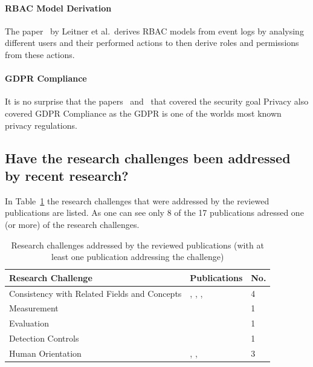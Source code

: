 \documentclass[runningheads]{llncs}
\begin{document}
\paragraph{RBAC Model Derivation} The paper~\cite{Leitner2013719} by Leitner et al.\ derives RBAC models from event logs by analysing different users and their performed actions to then derive roles and permissions from these actions.
\paragraph{GDPR Compliance} It is no surprise that the papers~\cite{Zaman20192982} and~\cite{MozafariMehr202182} that covered the security goal Privacy also covered GDPR Compliance as the GDPR is one of the worlds most known privacy regulations.
\subsection{Have the research challenges been addressed by recent research?}\label{Q2}
In Table~\ref{challenges_table} the research challenges that were addressed by the reviewed publications are listed. As one can see only 8 of the 17 publications adressed one (or more) of the research challenges.\\
\begin{table}
    \centering
    \caption{Research challenges addressed by the reviewed publications (with at least one publication addressing the challenge)}
    \label{challenges_table}
    \begin{tabular}{ | l | l | l | }
        \hline
        \textbf{Research Challenge}                  & \textbf{Publications}                                                                         & \textbf{No. } \\
        \hline
        \hline
        Consistency with Related Fields and Concepts & \cite{Zaman20192982}, \cite{Accorsi20131462}, \cite{Zahoransky2014360}, \cite{Dedousis202235} & 4             \\
        \hline
        Measurement                                  & \cite{Dedousis202235}                                                                         & 1             \\
        \hline
        Evaluation                                   & \cite{Zahoransky2014360}                                                                      & 1             \\

        \hline
        Detection Controls                           & \cite{Mishra2018613}                                                                          & 1             \\
        \hline
        Human Orientation                            & \cite{Mardani2013}, \cite{Zhu201783}, \cite{MacAk2020}                                        & 3             \\
        \hline
    \end{tabular}
\end{table}
\end{document}
